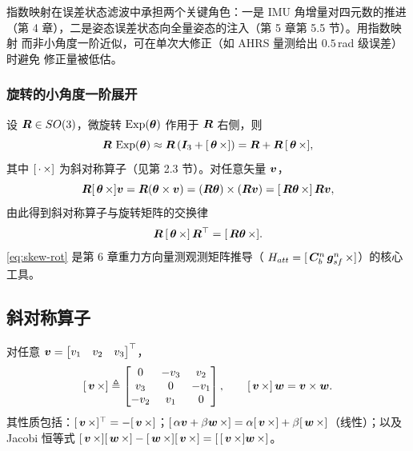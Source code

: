 指数映射在误差状态滤波中承担两个关键角色：一是 IMU 角增量对四元数的推进
（第 4 章），二是姿态误差状态向全量姿态的注入（第 5 章第 5.5 节）。用指数映射
而非小角度一阶近似，可在单次大修正（如 AHRS 量测给出 $0.5$\,rad 级误差）时避免
修正量被低估。

\subsubsection{旋转的小角度一阶展开}

设 $\boldsymbol{R} \in SO(3)$，微旋转 $\operatorname{Exp}(\boldsymbol{\theta})$ 作用于 $\boldsymbol{R}$ 右侧，则
\begin{equation}
  \boldsymbol{R}\,\operatorname{Exp}(\boldsymbol{\theta}) \approx \boldsymbol{R}\left(\boldsymbol{I}_3 + [\,\boldsymbol{\theta}\,\times]\right)
  = \boldsymbol{R} + \boldsymbol{R}\,[\,\boldsymbol{\theta}\,\times],
  \label{eq:small-rotation}
\end{equation}
其中 $[\,\cdot\,\times]$ 为斜对称算子（见第 2.3 节）。对任意矢量 $\boldsymbol{v}$，
\begin{equation}
  \boldsymbol{R}[\,\boldsymbol{\theta}\,\times]\boldsymbol{v}
  = \boldsymbol{R}(\boldsymbol{\theta} \times \boldsymbol{v})
  = (\boldsymbol{R}\boldsymbol{\theta}) \times (\boldsymbol{R}\boldsymbol{v})
  = [\,\boldsymbol{R}\boldsymbol{\theta}\,\times]\,\boldsymbol{R}\boldsymbol{v},
  \label{eq:skew-rot-commute}
\end{equation}
由此得到斜对称算子与旋转矩阵的交换律
\begin{equation}
  \boldsymbol{R}\,[\,\boldsymbol{\theta}\,\times]\,\boldsymbol{R}^\top = [\,\boldsymbol{R}\boldsymbol{\theta}\,\times].
  \label{eq:skew-rot}
\end{equation}
\cref{eq:skew-rot} 是第 6 章重力方向量测观测矩阵推导（
$H_{att} = [\,\boldsymbol{C}_b^n\,\boldsymbol{g}_{sf}^n\,\times]$）的核心工具。

\subsection{斜对称算子}

\begin{definition}[斜对称算子]
对任意 $\boldsymbol{v} = \begin{bmatrix} v_1 & v_2 & v_3 \end{bmatrix}^{\top}$，
\begin{equation}
  [\,\boldsymbol{v}\,\times] \triangleq
  \begin{bmatrix}
    0 & -v_3 & v_2 \\
    v_3 & 0 & -v_1 \\
    -v_2 & v_1 & 0
  \end{bmatrix},
  \qquad
  [\,\boldsymbol{v}\,\times]\,\boldsymbol{w} = \boldsymbol{v} \times \boldsymbol{w}.
  \label{eq:skew-def}
\end{equation}
其性质包括：$[\,\boldsymbol{v}\,\times]^{\top} = -[\,\boldsymbol{v}\,\times]$；$[\,\alpha\boldsymbol{v} + \beta\boldsymbol{w}\,\times]
= \alpha[\,\boldsymbol{v}\,\times] + \beta[\,\boldsymbol{w}\,\times]$（线性）；以及 Jacobi 恒等式
$[\,\boldsymbol{v}\,\times][\,\boldsymbol{w}\,\times] - [\,\boldsymbol{w}\,\times][\,\boldsymbol{v}\,\times]
= [\,[\,\boldsymbol{v}\,\times]\boldsymbol{w}\,\times]$。
\end{definition}


